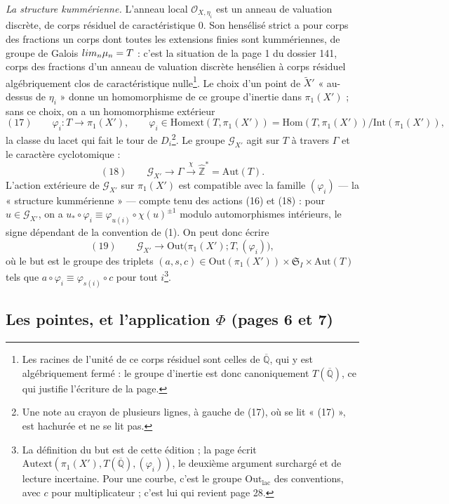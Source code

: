 \documentclass[11pt,a4paper]{article}
\begin{document}
\emph{La structure kummérienne.} L'anneau local $\mathcal{O}_{X,\eta_i}$ est un
anneau de valuation discrète, de corps résiduel de caractéristique $0$. Son
hensélisé strict a pour corps des fractions un corps dont toutes les
extensions finies sont kummériennes, de groupe de Galois $\varprojlim_n
\mu_n = T$ : c'est la situation de la page 1 du dossier 141, corps des
fractions d'un anneau de valuation discrète hensélien à corps résiduel
algébriquement clos de caractéristique nulle\footnote{Les racines de l'unité
de ce corps résiduel sont celles de $\overline{\mathbb{Q}}$, qui y est
algébriquement fermé : le groupe d'inertie est donc canoniquement
$T(\overline{\mathbb{Q}})$, ce qui justifie l'écriture de la page.}. Le choix
d'un point de $\widetilde X'$ « au-dessus de $\eta_i$ » donne un
homomorphisme de ce groupe d'inertie dans $\pi_1(X')$ ; sans ce choix, on a un
homomorphisme extérieur
\[
(17)\qquad \varphi_i : T \longrightarrow \pi_1(X'), \qquad \varphi_i \in
\mathrm{Homext}(T, \pi_1(X')) = \mathrm{Hom}(T, \pi_1(X'))/\mathrm{Int}(\pi_1(X')),
\]
la classe du lacet qui fait le tour de $D_i$\footnote{Une note au crayon de
plusieurs lignes, à gauche de (17), où se lit « (17) », est hachurée et ne se
lit pas.}. Le groupe $\mathcal{G}_{X'}$ agit sur $T$ à travers $\Gamma$ et le
caractère cyclotomique :
\[
(18)\qquad \mathcal{G}_{X'} \longrightarrow \Gamma \xrightarrow{\ \chi\ }
\widehat{\mathbb{Z}}^{*} = \mathrm{Aut}(T).
\]
L'action extérieure de $\mathcal{G}_{X'}$ sur $\pi_1(X')$ est compatible avec
la famille $(\varphi_i)$ — la « structure kummérienne » — compte tenu des
actions (16) et (18) : pour $u \in \mathcal{G}_{X'}$, on a $u_* \circ \varphi_i
\equiv \varphi_{u(i)} \circ \chi(u)^{\pm 1}$ modulo automorphismes intérieurs,
le signe dépendant de la convention de (1). On peut donc écrire
\[
(19)\qquad \mathcal{G}_{X'} \longrightarrow \mathrm{Out}\bigl(\pi_1(X'); T,
(\varphi_i)\bigr),
\]
où le but est le groupe des triplets $(a, s, c) \in \mathrm{Out}(\pi_1(X'))
\times \mathfrak{S}_I \times \mathrm{Aut}(T)$ tels que $a \circ \varphi_i \equiv
\varphi_{s(i)} \circ c$ pour tout $i$\footnote{La définition du but est de
cette édition ; la page écrit $\mathrm{Autext}(\pi_1(X'), T(\overline{\mathbb{Q}}),
(\varphi_i))$, le deuxième argument surchargé et de lecture incertaine. Pour une
courbe, c'est le groupe $\mathrm{Out}_{\mathrm{lac}}$ des conventions, avec
$c$ pour multiplicateur ; c'est lui qui revient page 28.}.

\subsection*{Les pointes, et l'application $\Phi$ (pages 6 et 7)}
\end{document}
